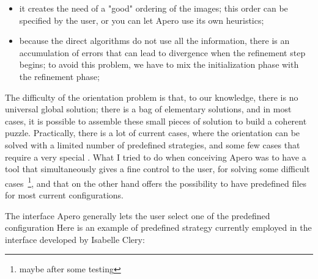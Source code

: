 \begin{itemize}
   \item  it creates the need of a "good" ordering of the images;
           this order can be specified by the user, or you can let Apero use its
           own heuristics;

   \item   because the direct algorithms do not use all the information, there is an accumulation
           of errors that can lead to divergence when the refinement step begins; to avoid
           this problem, we have to mix the initialization phase with the refinement phase;

\end{itemize}



The difficulty of the orientation problem is that, to our knowledge, there is no
universal global solution; there is a bag of elementary solutions, and in most cases,
it is possible to assemble these small pieces of solution to build a coherent puzzle.
Practically, there is a lot of current cases, where the orientation can be solved
with a limited number of predefined strategies, and some few cases that
require a very special .
What I tried to do when conceiving Apero was to have a tool that simultaneously
gives a fine control to the user, for solving some difficult cases~\footnote{maybe
after some testing}, and that on the other hand offers the possibility to have
predefined files for most current configurations.

The interface  Apero generally lets the user select one of the predefined
configuration  %
Here is an example of predefined strategy currently employed in the
interface developed by Isabelle Clery:




